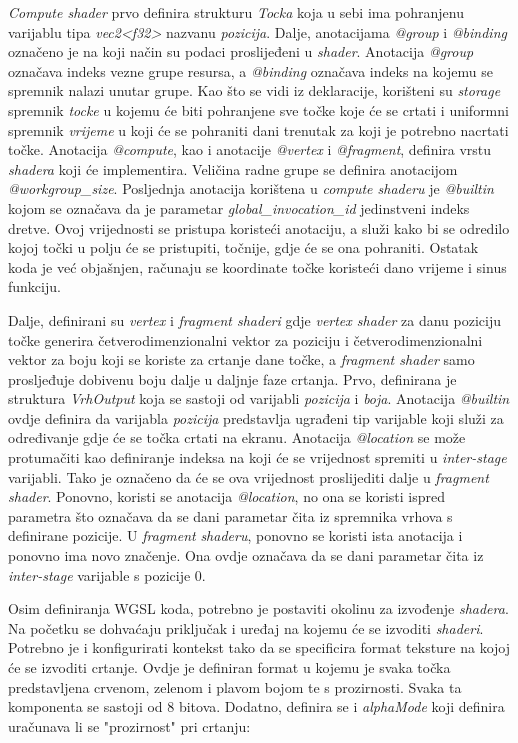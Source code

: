 \documentclass{foi}
\begin{document}
\textit{Compute shader} prvo definira strukturu \textit{Tocka} koja u sebi ima pohranjenu varijablu tipa \textit{vec2<f32>} nazvanu \textit{pozicija}. Dalje, anotacijama \textit{@group} i \textit{@binding} označeno je na koji način su podaci proslijeđeni u \textit{shader}. Anotacija \textit{@group} označava indeks vezne grupe resursa, a \textit{@binding} označava indeks na kojemu se spremnik nalazi unutar grupe. Kao što se vidi iz deklaracije, korišteni su \textit{storage} spremnik \textit{tocke} u kojemu će biti pohranjene sve točke koje će se crtati i uniformni spremnik \textit{vrijeme} u koji će se pohraniti dani trenutak za koji je potrebno nacrtati točke. Anotacija \textit{@compute}, kao i anotacije \textit{@vertex} i \textit{@fragment}, definira vrstu \textit{shadera} koji će implementira. Veličina radne grupe se definira anotacijom \textit{@workgroup\_size}. Posljednja anotacija korištena u \textit{compute shaderu} je \textit{@builtin} kojom se označava da je parametar \textit{global\_invocation\_id} jedinstveni indeks dretve. Ovoj vrijednosti se pristupa koristeći anotaciju, a služi kako bi se odredilo kojoj točki u polju će se pristupiti, točnije, gdje će se ona pohraniti. Ostatak koda je već objašnjen, računaju se koordinate točke koristeći dano vrijeme i sinus funkciju.

Dalje, definirani su \textit{vertex} i \textit{fragment shaderi} gdje \textit{vertex shader} za danu poziciju točke generira četverodimenzionalni vektor za poziciju i četverodimenzionalni vektor za boju koji se koriste za crtanje dane točke, a \textit{fragment shader} samo prosljeđuje dobivenu boju dalje u daljnje faze crtanja.  Prvo, definirana je struktura \textit{VrhOutput} koja se sastoji od varijabli \textit{pozicija} i \textit{boja}. Anotacija \textit{@builtin} ovdje definira da varijabla \textit{pozicija} predstavlja ugrađeni tip varijable koji služi za određivanje gdje će se točka crtati na ekranu. Anotacija \textit{@location} se može protumačiti kao definiranje indeksa na koji će se vrijednost spremiti u \textit{inter-stage} varijabli. Tako je označeno da će se ova vrijednost proslijediti dalje u \textit{fragment shader}. Ponovno, koristi se anotacija \textit{@location}, no ona se koristi ispred parametra što označava da se dani parametar čita iz spremnika vrhova s definirane pozicije. U \textit{fragment} \textit{shaderu}, ponovno se koristi ista anotacija i ponovno ima novo značenje. Ona ovdje označava da se dani parametar čita iz \textit{inter-stage} varijable s pozicije 0.

Osim definiranja WGSL koda, potrebno je postaviti okolinu za izvođenje \textit{shadera}. Na početku se dohvaćaju priključak i uređaj na kojemu će se izvoditi \textit{shaderi}. Potrebno je i konfigurirati kontekst tako da se specificira format teksture na kojoj će se izvoditi crtanje. Ovdje je definiran format u kojemu je svaka točka predstavljena crvenom, zelenom i plavom bojom te s prozirnosti. Svaka ta komponenta se sastoji od 8 bitova. Dodatno, definira se i \textit{alphaMode} koji definira uračunava li se "prozirnost" pri crtanju:
\end{document}
